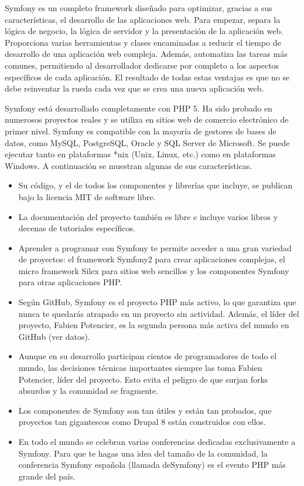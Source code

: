 Symfony es un completo framework diseñado para optimizar, gracias a sus características, el desarrollo de las aplicaciones web. Para empezar, separa la lógica de negocio, la lógica de servidor y la presentación de la aplicación web. Proporciona varias herramientas y clases encaminadas a reducir el tiempo de desarrollo de una aplicación web compleja. Además, automatiza las tareas más comunes, permitiendo al desarrollador dedicarse por completo a los aspectos específicos de cada aplicación. El resultado de todas estas ventajas es que no se debe reinventar la rueda cada vez que se crea una nueva aplicación web.

Symfony está desarrollado completamente con PHP 5. Ha sido probado en numerosos proyectos reales y se utiliza en sitios web de comercio electrónico de primer nivel. Symfony es compatible con la mayoría de gestores de bases de datos, como MySQL, PostgreSQL, Oracle y SQL Server de Microsoft. Se puede ejecutar tanto en plataformas *nix (Unix, Linux, etc.) como en plataformas Windows. A continuación se muestran algunas de sus características.

\begin{itemize}

\item Su código, y el de todos los componentes y librerías que incluye, se publican bajo la licencia MIT de software libre.
\item La documentación del proyecto también es libre e incluye varios libros y decenas de tutoriales específicos.
\item Aprender a programar con Symfony te permite acceder a una gran variedad de proyectos: el framework Symfony2 para crear aplicaciones complejas, el micro framework Silex para sitios web sencillos y los componentes Symfony para otras aplicaciones PHP.
\item Según GitHub, Symfony es el proyecto PHP más activo, lo que garantiza que nunca te quedarás atrapado en un proyecto sin actividad. Además, el líder del proyecto, Fabien Potencier, es la segunda persona más activa del mundo en GitHub (ver datos).
\item Aunque en su desarrollo participan cientos de programadores de todo el mundo, las decisiones técnicas importantes siempre las toma Fabien Potencier, líder del proyecto. Esto evita el peligro de que surjan forks absurdos y la comunidad se fragmente.
\item Los componentes de Symfony son tan útiles y están tan probados, que proyectos tan gigantescos como Drupal 8 están construidos con ellos.
\item En todo el mundo se celebran varias conferencias dedicadas exclusivamente a Symfony. Para que te hagas una idea del tamaño de la comunidad, la conferencia Symfony española (llamada deSymfony) es el evento PHP más grande del país.
 
\end{itemize}


